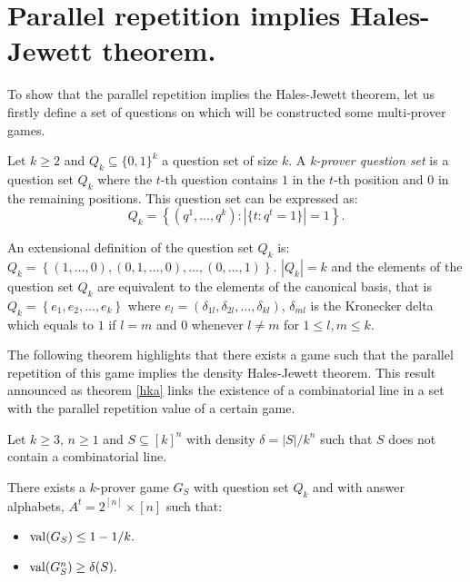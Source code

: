 \section{Parallel repetition implies Hales-Jewett theorem.}
 
To show that the parallel repetition implies the Hales-Jewett theorem, let us firstly define a set of questions on which will be constructed some multi-prover games.

\begin{defn}Let $k\geq 2$ and $Q_k \subseteq \{0,1\}^k$ a question set of size $k.$ A \textit{k-prover question set} is a question set $Q_k$ where the $t$-th question contains $1$ in the $t$-th position and $0$ in the remaining positions. This question set can be expressed as:
$$Q_k=\left\lbrace(q^1, \ldots, q^k): |\{t:q^t=1\}|=1\right\rbrace.$$		\end{defn}
 
 An extensional definition of the question set $Q_k$ is: $Q_k=\left\lbrace (1,\ldots,0), (0,1,\ldots,0), \ldots, (0,\ldots,1) \right\rbrace.$ $|Q_k|=k$ and the elements of the question set $Q_k$ are equivalent to the elements of the canonical basis, that is $Q_k= \left\lbrace e_1, e_2, \ldots, e_k\right\rbrace$ where $e_l=(\delta_{1l}, \delta_{2l}, \ldots, \delta_{kl} )$, $\delta_{ml}$ is the Kronecker delta which equals to $1$ if $l=m$ and $0$ whenever $l \neq m$ for $1 \leq l, m \leq  k.$ 

The following theorem highlights that there exists a game such that the parallel repetition of this game  implies the density Hales-Jewett theorem. This result announced as theorem \eqref{hka} links the existence of a combinatorial line in a set with the parallel repetition value of a certain game.

 \begin{thm} Let $k\geq 3$, $n\geq 1$ and $S\subseteq [k]^n$ with density $\delta=|S|/k^n$ such that $S$ does not contain a combinatorial line.	
 
There exists a $k$-prover game $G_S$ with question set $Q_k$ and with answer alphabets,
$A^t = 2^{[n]} \times [n]$ such that:
\begin{itemize}
\item $\mathrm{val} (G_S) \leq 1-1/k.$ 	\item $\mathrm{val} (G_S^n) \geq \delta(S).$
\end{itemize} \label{hka}
 	\end{thm}

